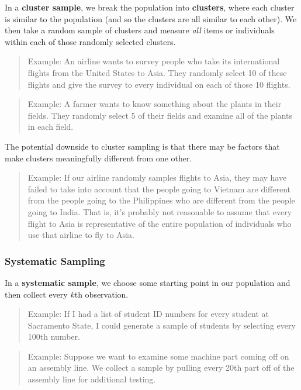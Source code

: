 \documentclass[
]{book}
\begin{document}
In a \textbf{cluster sample}, we break the population into \textbf{clusters}, where each cluster is similar to the population (and so the clusters are all similar to each other). We then take a random sample of clusters and measure \emph{all} items or individuals within each of those randomly selected clusters.

\begin{quote}
Example: An airline wants to survey people who take its international flights from the United States to Asia. They randomly select 10 of these flights and give the survey to every individual on each of those 10 flights.
\end{quote}

\begin{quote}
Example: A farmer wants to know something about the plants in their fields. They randomly select 5 of their fields and examine all of the plants in each field.
\end{quote}

The potential downside to cluster sampling is that there may be factors that make clusters meaningfully different from one other.

\begin{quote}
Example: If our airline randomly samples flights to Asia, they may have failed to take into account that the people going to Vietnam are different from the people going to the Philippines who are different from the people going to India. That is, it's probably not reasonable to assume that every flight to Asia is representative of the entire population of individuals who use that airline to fly to Asia.
\end{quote}

\subsubsection*{Systematic Sampling}\label{systematic-sampling}

In a \textbf{systematic sample}, we choose some starting point in our population and then collect every \(k\)th observation.

\begin{quote}
Example: If I had a list of student ID numbers for every student at Sacramento State, I could generate a sample of students by selecting every 100th number.
\end{quote}

\begin{quote}
Example: Suppose we want to examine some machine part coming off on an assembly line. We collect a sample by pulling every 20th part off of the assembly line for additional testing.
\end{quote}
\end{document}
